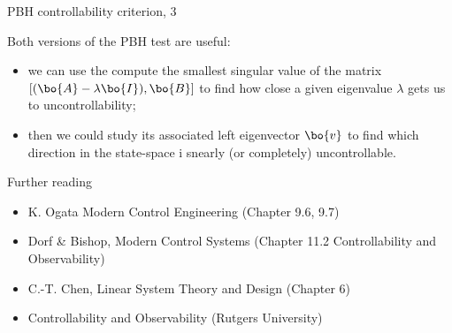 \documentclass{beamer}
\begin{document}
\begin{frame}{PBH controllability criterion, 3}
	\begin{flushleft}
		
		Both versions of the PBH test are useful: 
		
		\begin{itemize}
			\item we can use the compute the smallest singular value of the matrix $[ (\bo{A}-\lambda\bo{I}), \bo{B}]$ to find how close a given eigenvalue $\lambda$ gets us to uncontrollability; 
			
			\item then we could study its associated left eigenvector $\bo{v}$ to find which direction in the state-space i snearly (or completely) uncontrollable.
		\end{itemize}
		
		
		
	\end{flushleft}
\end{frame}




\begin{frame}{Further reading}
	
	\begin{itemize}
		
		
		\item K. Ogata Modern Control Engineering (Chapter 9.6, 9.7)
		
		\item Dorf \& Bishop, Modern Control Systems (Chapter 11.2 Controllability and Observability)		
		
		\item C.-T. Chen, Linear System Theory and Design (Chapter 6)
		
		\item Controllability and Observability (Rutgers University) 
		
	\end{itemize}
	
\end{frame}

\myqrframe


\begin{frame}
	
	
\end{frame}
\end{document}

